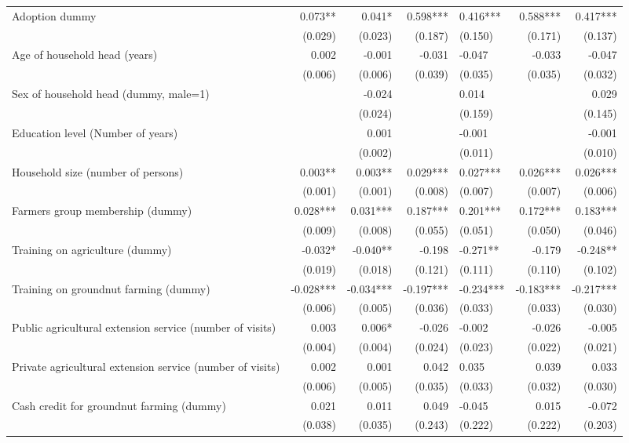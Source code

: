 \documentclass[
]{article}
\begin{document}
\begin{landscape}
\begin{longtable}[t]{lrrrlrr}
\endfoot
\bottomrule
\endlastfoot
Adoption dummy & 0.073** & 0.041* & 0.598*** & 0.416*** & 0.588*** & 0.417***\\
 & (0.029) & (0.023) & (0.187) & (0.150) & (0.171) & (0.137)\\
Age of household head (years) & 0.002 & -0.001 & -0.031 & -0.047 & -0.033 & -0.047\\
 & (0.006) & (0.006) & (0.039) & (0.035) & (0.035) & (0.032)\\
Sex of household head (dummy, male=1) &  & -0.024 &  & 0.014 &  & 0.029\\
\addlinespace
 &  & (0.024) &  & (0.159) &  & (0.145)\\
Education level (Number of years) &  & 0.001 &  & -0.001 &  & -0.001\\
 &  & (0.002) &  & (0.011) &  & (0.010)\\
Household size (number of persons) & 0.003** & 0.003** & 0.029*** & 0.027*** & 0.026*** & 0.026***\\
 & (0.001) & (0.001) & (0.008) & (0.007) & (0.007) & (0.006)\\
\addlinespace
Farmers group membership (dummy) & 0.028*** & 0.031*** & 0.187*** & 0.201*** & 0.172*** & 0.183***\\
 & (0.009) & (0.008) & (0.055) & (0.051) & (0.050) & (0.046)\\
Training on agriculture (dummy) & -0.032* & -0.040** & -0.198 & -0.271** & -0.179 & -0.248**\\
 & (0.019) & (0.018) & (0.121) & (0.111) & (0.110) & (0.102)\\
Training on groundnut farming (dummy) & -0.028*** & -0.034*** & -0.197*** & -0.234*** & -0.183*** & -0.217***\\
\addlinespace
 & (0.006) & (0.005) & (0.036) & (0.033) & (0.033) & (0.030)\\
Public agricultural extension service (number of visits) & 0.003 & 0.006* & -0.026 & -0.002 & -0.026 & -0.005\\
 & (0.004) & (0.004) & (0.024) & (0.023) & (0.022) & (0.021)\\
Private agricultural extension service (number of visits) & 0.002 & 0.001 & 0.042 & 0.035 & 0.039 & 0.033\\
 & (0.006) & (0.005) & (0.035) & (0.033) & (0.032) & (0.030)\\
\addlinespace
Cash credit for groundnut farming (dummy) & 0.021 & 0.011 & 0.049 & -0.045 & 0.015 & -0.072\\
 & (0.038) & (0.035) & (0.243) & (0.222) & (0.222) & (0.203)\\

\end{longtable}
\end{landscape}
\end{document}
